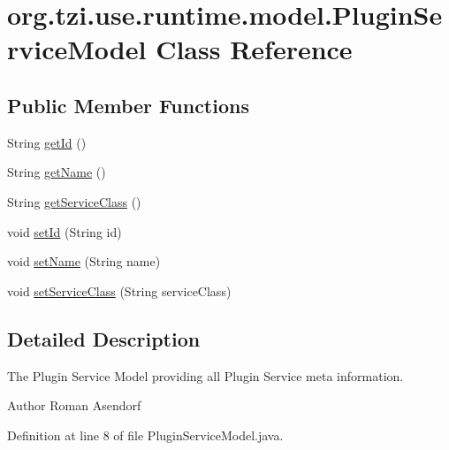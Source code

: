 \hypertarget{classorg_1_1tzi_1_1use_1_1runtime_1_1model_1_1_plugin_service_model}{\section{org.\-tzi.\-use.\-runtime.\-model.\-Plugin\-Service\-Model Class Reference}
\label{classorg_1_1tzi_1_1use_1_1runtime_1_1model_1_1_plugin_service_model}
}
\subsection*{Public Member Functions}
\begin{DoxyCompactItemize}
\item 
String \hyperlink{classorg_1_1tzi_1_1use_1_1runtime_1_1model_1_1_plugin_service_model_ab317d1cee17ec35327edaee90583aace}{get\-Id} ()
\item 
String \hyperlink{classorg_1_1tzi_1_1use_1_1runtime_1_1model_1_1_plugin_service_model_aa13478daa4a22240a52325644ee210c8}{get\-Name} ()
\item 
String \hyperlink{classorg_1_1tzi_1_1use_1_1runtime_1_1model_1_1_plugin_service_model_a6756a00d0a3c475df824db90cedaa12f}{get\-Service\-Class} ()
\item 
void \hyperlink{classorg_1_1tzi_1_1use_1_1runtime_1_1model_1_1_plugin_service_model_a81fb7126ef788834011405f3afe753e6}{set\-Id} (String id)
\item 
void \hyperlink{classorg_1_1tzi_1_1use_1_1runtime_1_1model_1_1_plugin_service_model_ab33b1de41903b8a31a9160d8f2b8377b}{set\-Name} (String name)
\item 
void \hyperlink{classorg_1_1tzi_1_1use_1_1runtime_1_1model_1_1_plugin_service_model_ae492bb4178adc122b9a0c65835310002}{set\-Service\-Class} (String service\-Class)
\end{DoxyCompactItemize}


\subsection{Detailed Description}
The Plugin Service Model providing all Plugin Service meta information.

\begin{DoxyAuthor}{Author}
Roman Asendorf 
\end{DoxyAuthor}


Definition at line 8 of file Plugin\-Service\-Model.\-java.



